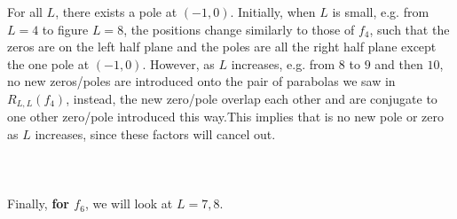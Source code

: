\documentclass[10pt]{article}
\begin{document}
\noindent For all $L$, there exists a pole at $(-1,0)$. Initially, when $L$ is small, e.g. from $L=4$ to figure $L=8$, the positions change similarly to those of $f_4$, such that the zeros are on the left half plane and the poles are all the right half plane except the one pole at $(-1,0)$. However, as $L$ increases, e.g. from $8$ to $9$ and then $10$, no new zeros/poles are introduced onto the pair of parabolas we saw in $R_{L,L}(f_4)$, instead, the new zero/pole overlap each other and are conjugate to one other zero/pole introduced this way.This implies that is no new pole or zero as $L$ increases, since these factors will cancel out.\\\\
\\\\
Finally, \textbf{for $f_6$}, we will look at $L=7,8$.
\end{document}
